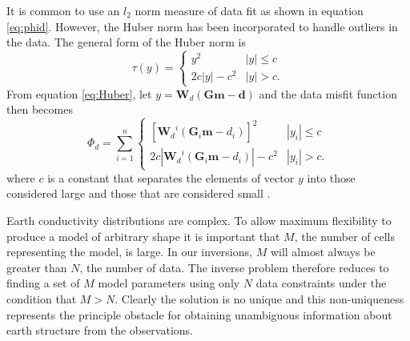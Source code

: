 It is common to use an $l_2$ norm measure of data fit as shown in equation \ref{eq:phid}. However, the Huber norm \cite[]{Huber64} has been incorporated to handle outliers in the data. The general form of the Huber norm is
\begin{equation}
\label{eq:Huber}
\tau(y) = \begin{cases}
y^2 & |y| \leq c \\
2c|y| - c^2 & |y| > c.
\end{cases}
\end{equation}
From equation \ref{eq:Huber}, let $y=\textbf{W}_d(\textbf{G}\mathbf{m}-\textbf{d})$ and the data misfit function then becomes
\begin{equation}
\label{eq:Huber_phid}
\Phi_d = \sum_{i=1}^n \begin{cases}
\left[ {\textbf{W}_d}^i(\textbf{G}_i\mathbf{m}-{d_i}) \right] ^2 & |y_i| \leq c \\
2c|{\textbf{W}_d}^i(\textbf{G}_i\mathbf{m}-{d_i})|-c^2 & |y_i| > c.
\end{cases}
\end{equation}
where $c$ is a constant that separates the elements of vector $y$ into those considered large and those that are considered small \cite[]{FarquharsonOldenburg98}. 

Earth conductivity distributions are complex. To allow maximum flexibility to produce a model of arbitrary shape it is important that $M$, the number of cells representing the model, is large. In our inversions, $M$ will almost always be greater than $N$, the number of data. The inverse problem therefore reduces to finding a set of $M$ model parameters using only $N$ data constraints under the condition that $M > N$. Clearly the solution is no unique and this non-uniqueness represents the principle obstacle for obtaining unambiguous information about earth structure from the observations.
 
